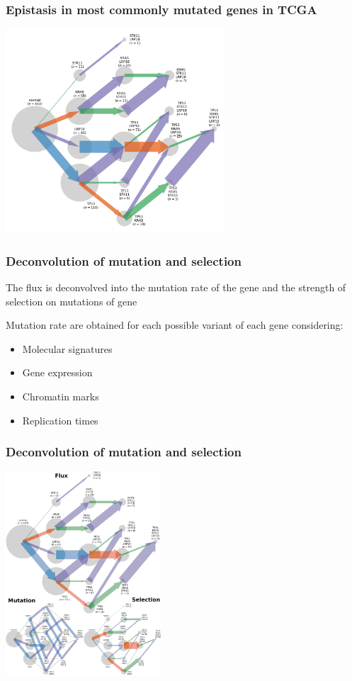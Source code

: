 \documentclass{beamer}
\newenvironment{itemize+}{\begin{itemize}[<+->]}{\end{itemize}}
\begin{document}
\begin{frame}
  \frametitle{Epistasis in most commonly mutated genes in TCGA}
  \begin{center}
    \includegraphics[height=3in]{landscape_lambdas_luad_4}
  \end{center}
\end{frame}


\begin{frame}
  \frametitle{Deconvolution of mutation and selection}
  \begin{itemize+}
  \item The flux is deconvolved into the mutation rate of the gene and
    the strength of selection on mutations of gene
  \item Mutation rate are obtained for each possible variant of each
    gene considering:
    \begin{itemize}
    \item Molecular signatures
    \item Gene expression
    \item Chromatin marks
    \item Replication times
    \end{itemize}
  \end{itemize+}
\end{frame}

\begin{frame}
  \frametitle{Deconvolution of mutation and selection}
  \begin{center}
    \includegraphics[height=3in]{all_landscapes_luad_4_sf}
  \end{center}
\end{frame}
\end{document}
